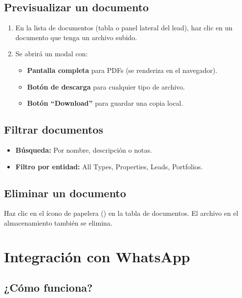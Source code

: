 \documentclass[12pt,oneside]{article}
\begin{document}
\subsection{Previsualizar un documento}

\begin{enumerate}[leftmargin=*]
  \item En la lista de documentos (tabla o panel lateral del lead), haz clic en un documento que tenga un archivo subido.
  \item Se abrirá un modal con:
  \begin{itemize}
    \item \textbf{Pantalla completa} para PDFs (se renderiza en el navegador).
    \item \textbf{Botón de descarga} para cualquier tipo de archivo.
    \item \textbf{Botón “Download”} para guardar una copia local.
  \end{itemize}
\end{enumerate}

\subsection{Filtrar documentos}

\begin{itemize}[leftmargin=*]
  \item \textbf{Búsqueda:} Por nombre, descripción o notas.
  \item \textbf{Filtro por entidad:} All Types, Properties, Leads, Portfolios.
\end{itemize}

\subsection{Eliminar un documento}

Haz clic en el ícono de papelera (\faTrash) en la tabla de documentos. El archivo en el almacenamiento también se elimina.

\section{Integración con WhatsApp}

\subsection{¿Cómo funciona?}
\end{document}
